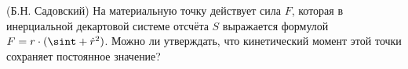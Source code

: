 (Б.Н. Садовский)
На материальную точку действует сила $F$, которая в инерциальной
декартовой системе отсчёта $S$ выражается формулой $F=r\cdot(\sint+\dot
r^2)$. Можно ли утверждать, что кинетический момент этой точки сохраняет
постоянное значение?



